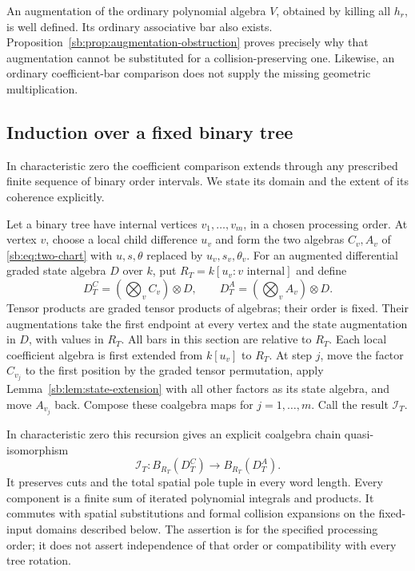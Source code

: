 An augmentation of the ordinary polynomial algebra \(V\), obtained
by killing all \(h_r\), is well defined.  Its ordinary associative
bar also exists.  Proposition~\ref{sb:prop:augmentation-obstruction}
proves precisely why that augmentation cannot be substituted for a
collision-preserving one.  Likewise, an ordinary coefficient-bar
comparison does not supply the missing geometric multiplication.



\subsection{Induction over a fixed binary tree}

In characteristic zero the coefficient comparison extends through any prescribed finite
sequence of binary order intervals.  We state its domain and the
extent of its coherence explicitly.

Let a binary tree have internal vertices \(v_1,\ldots,v_m\),
in a chosen processing order.  At vertex \(v\), choose a local
child difference \(u_v\) and form the two algebras \(C_v,A_v\)
of \eqref{sb:eq:two-chart} with \(u,s,\theta\) replaced by
\(u_v,s_v,\theta_v\).
For an augmented differential graded state algebra \(D\) over \(k\),
put \(R_T=k[u_v:v\text{ internal}]\) and define
\[
 D_T^C=\left(\bigotimes_{v}C_v\right)\otimes D,
 \qquad
 D_T^A=\left(\bigotimes_{v}A_v\right)\otimes D.
\]
Tensor products are graded tensor products of algebras; their order is fixed.
Their augmentations take the first endpoint at every vertex and the
state augmentation in \(D\), with values in \(R_T\).
All bars in this section are relative to \(R_T\).  Each local
coefficient algebra is first extended from \(k[u_v]\) to \(R_T\).
At step \(j\), move the factor \(C_{v_j}\) to the first
position by the graded tensor permutation, apply
Lemma~\ref{sb:lem:state-extension} with all other factors as its state
algebra, and move \(A_{v_j}\) back.  Compose these coalgebra maps
for \(j=1,\ldots,m\).  Call the result \(\mathcal I_T\).

\begin{theorem}\label{sb:thm:tree-bars}
In characteristic zero this recursion gives an explicit coalgebra
chain quasi-isomorphism
\[
 \mathcal I_T:B_{R_T}(D_T^C)\longrightarrow B_{R_T}(D_T^A).
\]
It preserves cuts and the total spatial pole tuple in every word length.
Every component is a finite sum of iterated polynomial integrals and
products.  It commutes with spatial substitutions and formal collision
expansions on the fixed-input domains described below.
The assertion is for the specified processing order; it does not assert
independence of that order or compatibility with every tree rotation.
\end{theorem}

